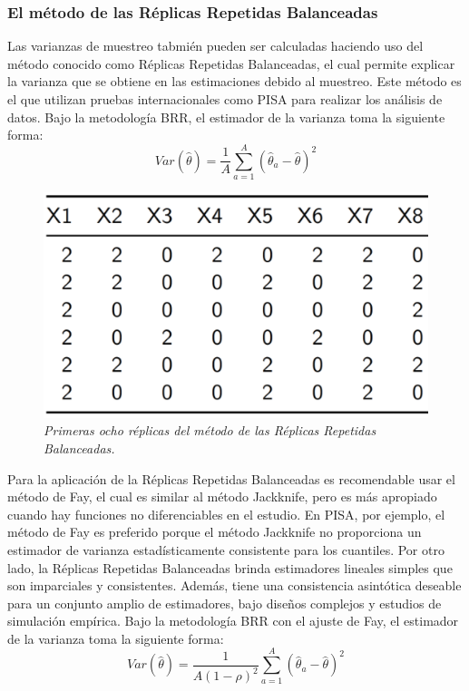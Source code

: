 \documentclass[12pt,spanish,]{book}
\begin{document}
\hypertarget{el-metodo-de-las-replicas-repetidas-balanceadas}{%
\subsubsection*{El método de las Réplicas Repetidas Balanceadas}\label{el-metodo-de-las-replicas-repetidas-balanceadas}}

Las varianzas de muestreo tabmién pueden ser calculadas haciendo uso del método conocido como Réplicas Repetidas Balanceadas, el cual permite explicar la varianza que se obtiene en las estimaciones debido al muestreo. Este método es el que utilizan pruebas internacionales como PISA para realizar los análisis de datos. Bajo la metodología BRR, el estimador de la varianza toma la siguiente forma:
\[
Var(\hat{\theta}) = \frac{1}{A}\sum_{a=1}^A(\hat{\theta}_a - \hat\theta )^2
\]

\begin{figure}
\centering
\includegraphics{Pics/21.png}
\caption{\emph{Primeras ocho réplicas del método de las Réplicas Repetidas Balanceadas.}}
\end{figure}

Para la aplicación de la Réplicas Repetidas Balanceadas es recomendable usar el método de Fay, el cual es similar al método Jackknife, pero es más apropiado cuando hay funciones no diferenciables en el estudio. En PISA, por ejemplo, el método de Fay es preferido porque el método Jackknife no proporciona un estimador de varianza estadísticamente consistente para los cuantiles. Por otro lado, la Réplicas Repetidas Balanceadas brinda estimadores lineales simples que son imparciales y consistentes. Además, tiene una consistencia asintótica deseable para un conjunto amplio de estimadores, bajo diseños complejos y estudios de simulación empírica. Bajo la metodología BRR con el ajuste de Fay, el estimador de la varianza toma la siguiente forma:
\[
Var(\hat{\theta}) = \frac{1}{A(1-\rho)^2}\sum_{a=1}^A(\hat{\theta}_a - \hat\theta )^2
\]
\end{document}
